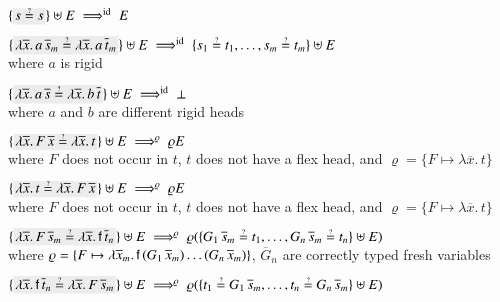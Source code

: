 \begin{description}[labelwidth=\widthof{\rm\unifrulename{Decomposition}}]
    \item[\rm\textsf{Deletion}] 
      $\{\selected{s \unif s}\} \uplus E \ptarrowid E$
    \item[\rm\textsf{Decomposition}]
      $\{\selected{\lambda \overline{x}. \, a \, \overline{s}_m \unif \lambda \overline{x}. \, a \, \overline{t}_m} \} 
        \uplus \allowbreak
        E \ptarrowid \{ s_1 \unif  t_1, \ldots, s_m \unif t_m \} \uplus E$
        \\ where $a$ is rigid
    \item[\rm\textsf{Failure}]
        $\{\selected{\lambda \overline{x}. \, a \, \overline{s} \unif \lambda \overline{x}. \, b \, \overline{t}} \} 
          \uplus \allowbreak
          E \ptarrowid \bot$
    \\ where $a$ and $b$ are different rigid heads
    \item[\rm\textsf{SolutionL}] 
      $\{\selected{\lambda \overline{x}.\, F\,\overline{x} \unif \lambda \overline{x}.\,t} \} \uplus E \ptarrow{\varrho} \varrho E$
      \\where $F$ does not occur in $t$, $t$ does not have a flex head, and $\varrho = \{ F \mapsto \lambda \overline{x}.\,t \}$
      \item[\rm\textsf{SolutionR}] 
      $\{\selected{\lambda \overline{x}.\,t \unif \lambda \overline{x}.\, F\,\overline{x}} \} \uplus E \ptarrow{\varrho} \varrho E$
      \\where $F$ does not occur in $t$, $t$ does not have a flex head, and $\varrho = \{ F \mapsto \lambda \overline{x}.\,t \}$ 
    \item[\rm\textsf{ImitationL}]
      $\{\selected{\lambda \overline{x}. \, F \, \overline{s}_m \unif \lambda
      \overline{x}. \, \cst{f} \, \overline{t}_n }\} \uplus E \ptarrow{\varrho}
      \varrho(\{ G_1 \,
      \overline{s}_m  \unif  t_1, \ldots,  G_n \, \overline{s}_m \allowbreak \unif t_n\} \uplus E)$ \\
       where $\varrho = \{ F \mapsto \lambda \overline{x}_m. \, \mathsf{f} \, (G_1
      \, \overline{x}_m) \ldots (G_n \, \overline{x}_m) \}$,
      $\overline{G}_n$ are correctly typed fresh variables
    \item[\rm\textsf{ImitationR}]
      $\{\selected{\lambda
      \overline{x}. \, \cst{f} \, \overline{t}_n \unif \lambda \overline{x}. \, F \, \overline{s}_m  }\} \uplus E \ptarrow{\varrho}
      \varrho(\{  t_1 \unif  G_1 \,
      \overline{s}_m, \ldots,  t_n \allowbreak \unif G_n \, \overline{s}_m\} \uplus E)$ \\

\end{description}
